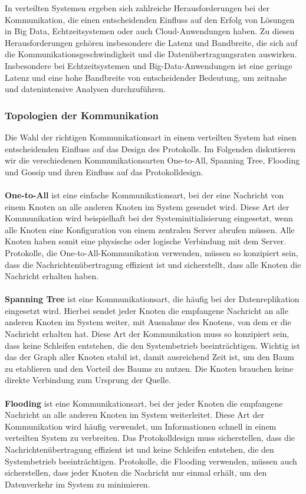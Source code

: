 \documentclass[../vs-script-first-v01.tex]{subfiles}
\begin{document}
In verteilten Systemen ergeben sich zahlreiche Herausforderungen bei der Kommunikation, die einen entscheidenden Einfluss auf den Erfolg von Lösungen in Big Data, Echtzeitsystemen oder auch Cloud-Anwendungen haben. Zu diesen Herausforderungen gehören insbesondere die Latenz und Bandbreite, die sich auf die Kommunikationsgeschwindigkeit und die Datenübertragungsraten auswirken. Insbesondere bei Echtzeitsystemen und Big-Data-Anwendungen ist eine geringe Latenz und eine hohe Bandbreite von entscheidender Bedeutung, um zeitnahe und datenintensive Analysen durchzuführen.
\subsubsection{Topologien der Kommunikation}
Die Wahl der richtigen Kommunikationsart in einem verteilten System hat einen entscheidenden Einfluss auf das Design des Protokolls. Im Folgenden diskutieren wir die verschiedenen Kommunikationsarten One-to-All, Spanning Tree, Flooding und Gossip und ihren Einfluss auf das Protokolldesign.
\\\\
\textbf{One-to-All} ist eine einfache Kommunikationsart, bei der eine Nachricht von einem Knoten an alle anderen Knoten im System gesendet wird. Diese Art der Kommunikation wird beispielhaft bei der Systeminitialisierung eingesetzt, wenn alle Knoten eine Konfiguration von einem zentralen Server abrufen müssen. Alle Knoten haben somit eine physische oder logische Verbindung mit dem Server. Protokolle, die One-to-All-Kommunikation verwenden, müssen so konzipiert sein, dass die Nachrichtenübertragung effizient ist und sicherstellt, dass alle Knoten die Nachricht erhalten haben.
\\\\
\textbf{Spanning Tree} ist eine Kommunikationsart, die häufig bei der Datenreplikation eingesetzt wird. Hierbei sendet jeder Knoten die empfangene Nachricht an alle anderen Knoten im System weiter, mit Ausnahme des Knotens, von dem er die Nachricht erhalten hat. Diese Art der Kommunikation muss so konzipiert sein, dass keine Schleifen entstehen, die den Systembetrieb beeinträchtigen. Wichtig ist das der Graph aller Knoten stabil ist, damit ausreichend Zeit ist, um den Baum zu etablieren und den Vorteil des Baums zu nutzen. Die Knoten brauchen keine direkte Verbindung zum Ursprung der Quelle.
\\\\
\textbf{Flooding} ist eine Kommunikationsart, bei der jeder Knoten die empfangene Nachricht an alle anderen Knoten im System weiterleitet. Diese Art der Kommunikation wird häufig verwendet, um Informationen schnell in einem verteilten System zu verbreiten. Das Protokolldesign muss sicherstellen, dass die Nachrichtenübertragung effizient ist und keine Schleifen entstehen, die den Systembetrieb beeinträchtigen. Protokolle, die Flooding verwenden, müssen auch sicherstellen, dass jeder Knoten die Nachricht nur einmal erhält, um den Datenverkehr im System zu minimieren.
\end{document}
